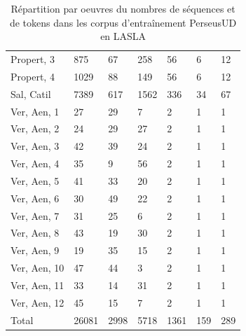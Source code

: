 \begin{table}[h]
\begin{tabular}{l|lll|lll}
 Propert, 3   & 875    & 67   & 258  & 56     & 6   & 12   \\
 Propert, 4   & 1029   & 88   & 149  & 56     & 6   & 12   \\
 Sal, Catil   & 7389   & 617  & 1562 & 336    & 34  & 67   \\
 Ver, Aen, 1  & 27     & 29   & 7    & 2      & 1   & 1    \\
 Ver, Aen, 2  & 24     & 29   & 27   & 2      & 1   & 1    \\
 Ver, Aen, 3  & 42     & 39   & 24   & 2      & 1   & 1    \\
 Ver, Aen, 4  & 35     & 9    & 56   & 2      & 1   & 1    \\
 Ver, Aen, 5  & 41     & 33   & 20   & 2      & 1   & 1    \\
 Ver, Aen, 6  & 30     & 49   & 22   & 2      & 1   & 1    \\
 Ver, Aen, 7  & 31     & 25   & 6    & 2      & 1   & 1    \\
 Ver, Aen, 8  & 43     & 19   & 30   & 2      & 1   & 1    \\
 Ver, Aen, 9  & 19     & 35   & 15   & 2      & 1   & 1    \\
 Ver, Aen, 10 & 47     & 44   & 3    & 2      & 1   & 1    \\
 Ver, Aen, 11 & 33     & 14   & 31   & 2      & 1   & 1    \\
 Ver, Aen, 12 & 45     & 15   & 7    & 2      & 1   & 1    \\ \midrule
 Total        & 26081  & 2998 & 5718 & 1361   & 159 & 289  \\ \bottomrule
\hline
\end{tabular}
\caption{Répartition par oeuvres du nombres de séquences et de tokens dans les corpus d'entraînement PerseusUD en LASLA}
\label{table:lasla:perseus-ud}
\end{table}


